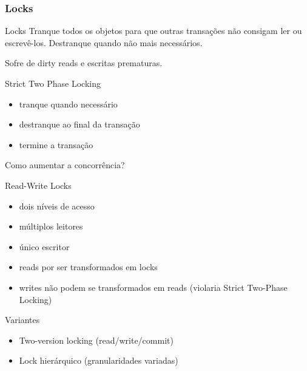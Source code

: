 \subsubsection{Locks}
\begin{frame}{Locks}
Tranque todos os objetos para que outras transações não consigam ler ou escrevê-los. Destranque quando não mais necessários.

Sofre de dirty reads e escritas prematuras.

\begin{block}{Strict Two Phase Locking}
\begin{itemize}
	\item tranque quando necessário
	\item destranque ao final da transação
	\item termine a transação
\end{itemize}

\end{block}

Como aumentar a concorrência?
\end{frame}

\begin{frame}{Read-Write Locks}
\begin{itemize}
	\item dois níveis de acesso
	\item múltiplos leitores
	\item único escritor
	\item reads por ser transformados em locks
	\item writes \alert{não} podem se transformados em reads (violaria Strict Two-Phase Locking)
\end{itemize}
\end{frame}

\begin{frame}{Variantes}
\begin{itemize}
	\item Two-version locking (read/write/commit)
	\item Lock hierárquico (granularidades variadas)
\end{itemize}
\end{frame}

